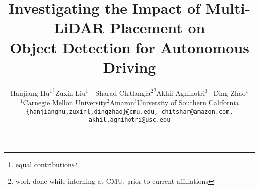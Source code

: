 \documentclass[10pt,twocolumn,letterpaper]{article}
\makeatletter
\newcommand{\printfnsymbol}[1]{%
  \textsuperscript{\@fnsymbol{#1}}%
}
\newcommand{\printfnsymbolnew}[2]{%
  \textsuperscript{\@fnsymbol{#1}}%
}
\makeatother
\begin{document}
%

\title{Investigating the Impact of Multi-LiDAR Placement  on \\ Object Detection   for Autonomous Driving}

\author{Hanjiang Hu$^{1}$\thanks{equal contribution}\quad  Zuxin Liu$^{1}$\printfnsymbol{1}\,\, Sharad Chitlangia$^{2}$\thanks{work done while interning at CMU, prior to current affiliations}\quad  Akhil Agnihotri$^{3}$\printfnsymbolnew{2}\,\, Ding Zhao$^{1}$\\
$^1$Carnegie Mellon University\quad   $^2$Amazon\quad  $^3$University of Southern California
\\ {\tt\small \{hanjianghu,zuxinl,dingzhao\}@cmu.edu, chitshar@amazon.com, akhil.agnihotri@usc.edu}
}
\maketitle
\end{document}
